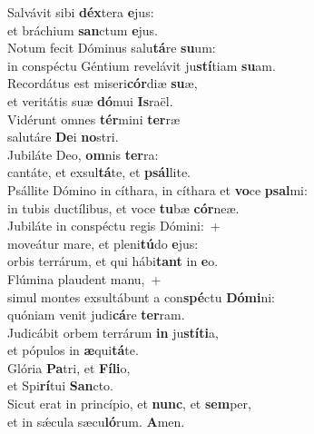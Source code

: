 \evenverse Salvávit sibi \textbf{déx}tera \textbf{e}jus:~\*\\
\evenverse et bráchium \textbf{san}ctum \textbf{e}jus.\\
\oddverse Notum fecit Dóminus salu\textbf{tá}re \textbf{su}um:~\*\\
\oddverse in conspéctu Géntium revelávit ju\textbf{stí}tiam \textbf{su}am.\\
\evenverse Recordátus est miseri\textbf{cór}diæ \textbf{su}æ,~\*\\
\evenverse et veritátis suæ \textbf{dó}mui \textbf{Is}raël.\\
\oddverse Vidérunt omnes \textbf{tér}mini \textbf{ter}ræ~\*\\
\oddverse salutáre \textbf{De}i \textbf{no}stri.\\
\evenverse Jubiláte Deo, \textbf{om}nis \textbf{ter}ra:~\*\\
\evenverse cantáte, et exsul\textbf{tá}te, et \textbf{psál}lite.\\
\oddverse Psállite Dómino in cíthara, in cíthara et \textbf{vo}ce \textbf{psal}mi:~\*\\
\oddverse in tubis ductílibus, et voce \textbf{tu}bæ \textbf{cór}neæ.\\
\evenverse Jubiláte in conspéctu regis Dómini:~+\\
\evenverse  moveátur mare, et pleni\textbf{tú}do \textbf{e}jus:~\*\\
\evenverse orbis terrárum, et qui hábi\textbf{tant} in \textbf{e}o.\\
\oddverse Flúmina plaudent manu,~+\\
\oddverse  simul montes exsultábunt a con\textbf{spé}ctu \textbf{Dó}\textbf{mi}ni:~\*\\
\oddverse quóniam venit judi\textbf{cá}re \textbf{ter}ram.\\
\evenverse Judicábit orbem terrárum \textbf{in} ju\textbf{stí}\textbf{ti}a,~\*\\
\evenverse et pópulos in \textbf{æ}qui\textbf{tá}te.\\
\oddverse Glória \textbf{Pa}tri, et \textbf{Fí}\textbf{li}o,~\*\\
\oddverse et Spi\textbf{rí}tui \textbf{San}cto.\\
\evenverse Sicut erat in princípio, et \textbf{nunc}, et \textbf{sem}per,~\*\\
\evenverse et in sǽcula sæcu\textbf{ló}rum. \textbf{A}men.\\
